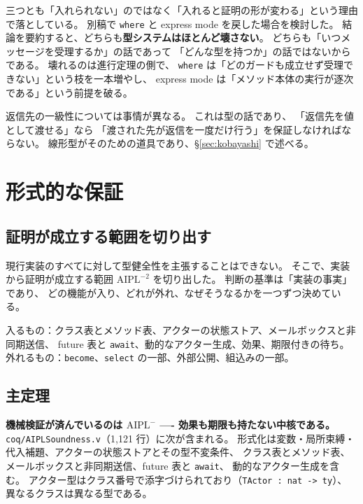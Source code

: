 \documentclass[11pt,a4paper]{ltjsarticle}
\theoremstyle{definition}
\theoremstyle{remark}
\begin{document}
三つとも「入れられない」のではなく「入れると証明の形が変わる」という理由で落としている。
別稿\cite{selffeatures}で \texttt{where} と express mode を戻した場合を検討した。
結論を要約すると、どちらも\textbf{型システムはほとんど壊さない}。
どちらも「いつメッセージを受理するか」の話であって
「どんな型を持つか」の話ではないからである。
壊れるのは進行定理の側で、
\texttt{where} は「どのガードも成立せず受理できない」という枝を一本増やし、
express mode は「メソッド本体の実行が逐次である」という前提を破る。

返信先の一級性については事情が異なる。
これは型の話であり、
「返信先を値として渡せる」なら
「渡された先が返信を一度だけ行う」を保証しなければならない。
線形型がそのための道具であり、\S\ref{sec:kobayashi} で述べる。

\section{形式的な保証}
\label{sec:proof}

\subsection{証明が成立する範囲を切り出す}

現行実装のすべてに対して型健全性を主張することはできない。
そこで、実装から証明が成立する範囲 $\mathrm{AIPL}^{-2}$ を切り出した\cite{selfsound2}。
判断の基準は「実装の事実」であり、
どの機能が入り、どれが外れ、なぜそうなるかを一つずつ決めている。

入るもの：クラス表とメソッド表、アクターの状態ストア、メールボックスと非同期送信、
future 表と \texttt{await}、動的なアクター生成、効果、期限付きの待ち。
外れるもの：\texttt{become}、\texttt{select} の一部、外部公開、組込みの一部。

\subsection{主定理}

\textbf{機械検証が済んでいるのは $\mathrm{AIPL}^{-}$ ---- 効果も期限も持たない中核である。}
\texttt{coq/AIPLSoundness.v}（1,121 行）に次が含まれる。
形式化は変数・局所束縛・代入補題、アクターの状態ストアとその型不変条件、
クラス表とメソッド表、メールボックスと非同期送信、future 表と \texttt{await}、
動的なアクター生成を含む。
アクター型はクラス番号で添字づけられており（\texttt{TActor : nat -> ty}）、
異なるクラスは異なる型である。
\end{document}
